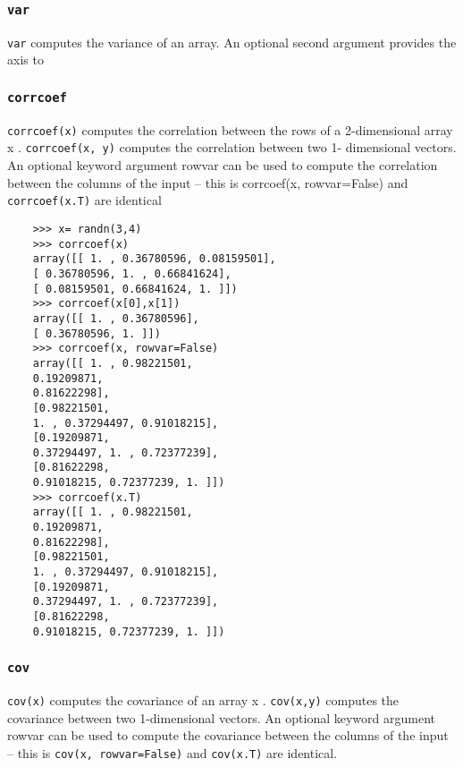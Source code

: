 \documentclass[KSmain.tex]{subfiles}
\begin{document}
\subsubsection*{\texttt{var}}
\texttt{var} computes the variance of an array. An optional second argument provides the axis to


\subsubsection*{\texttt{corrcoef}}
\texttt{corrcoef(x)} computes the correlation between the rows of a 2-dimensional array x . \texttt{corrcoef(x, y)} computes
the correlation between two 1- dimensional vectors. An optional keyword argument rowvar can be
used to compute the correlation between the columns of the input – this is corrcoef(x, rowvar=False)
and \texttt{corrcoef(x.T)} are identical

\begin{framed}
	\begin{verbatim}
	>>> x= randn(3,4)
	>>> corrcoef(x)
	array([[ 1. , 0.36780596, 0.08159501],
	[ 0.36780596, 1. , 0.66841624],
	[ 0.08159501, 0.66841624, 1. ]])
	>>> corrcoef(x[0],x[1])
	array([[ 1. , 0.36780596],
	[ 0.36780596, 1. ]])
	>>> corrcoef(x, rowvar=False)
	array([[ 1. , 0.98221501,
	0.19209871,
	0.81622298],
	[0.98221501,
	1. , 0.37294497, 0.91018215],
	[0.19209871,
	0.37294497, 1. , 0.72377239],
	[0.81622298,
	0.91018215, 0.72377239, 1. ]])
	>>> corrcoef(x.T)
	array([[ 1. , 0.98221501,
	0.19209871,
	0.81622298],
	[0.98221501,
	1. , 0.37294497, 0.91018215],
	[0.19209871,
	0.37294497, 1. , 0.72377239],
	[0.81622298,
	0.91018215, 0.72377239, 1. ]])
	\end{verbatim}
\end{framed}
\subsubsection*{\texttt{cov}}
\texttt{cov(x)} computes the covariance of an array x . \texttt{cov(x,y)} computes the covariance between two 1-dimensional
vectors. An optional keyword argument rowvar can be used to compute the covariance between the
columns of the input – this is \texttt{cov(x, rowvar=False)} and \texttt{cov(x.T)} are identical.
\end{document}
